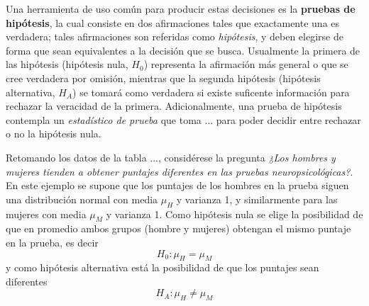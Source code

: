 Una herramienta de uso común para producir estas decisiones es la \textbf{pruebas de hipótesis},
la cual consiste en dos afirmaciones tales que exactamente una es verdadera; tales afirmaciones
son referidas como \textit{hipótesis}, y deben elegirse de forma que sean equivalentes a la 
decisión que se busca. 
%
Usualmente la primera de las hipótesis (hipótesis nula, $H_0$) representa la afirmación más general o que se cree verdadera por omisión, mientras que la segunda hipótesis (hipótesis alternativa, $H_A$) se tomará como verdadera si
existe suficente información para rechazar la veracidad de la primera.
%
Adicionalmente, una prueba de hipótesis contempla un \textit{estadístico de prueba} que toma ... para poder decidir entre rechazar o no la hipótesis nula.

Retomando los datos de la tabla ..., considérese la pregunta \textit{¿Los hombres y mujeres tienden
a obtener puntajes diferentes en las pruebas neuropsicológicas?}. 
%
En este ejemplo se supone que los puntajes de los hombres en la prueba siguen una distribución normal con media $\mu_H$ y varianza 1, y similarmente para las mujeres con media $\mu_M$ y varianza 1.
%
Como hipótesis nula se elige la posibilidad de que en promedio ambos grupos (hombre y mujeres) obtengan el mismo puntaje en la prueba, es decir
\begin{equation}
H_0 : \mu_H = \mu_M
\end{equation}
y como hipótesis alternativa está la posibilidad de que los puntajes sean diferentes
\begin{equation}
H_A : \mu_H \neq \mu_M
\end{equation}

